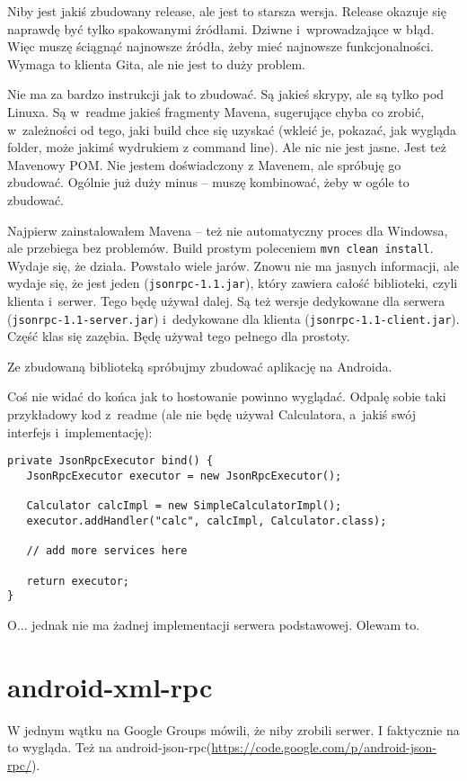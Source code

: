 Niby jest jakiś zbudowany release, ale jest to starsza wersja. Release okazuje się naprawdę być tylko spakowanymi źródłami. Dziwne i~wprowadzające w błąd.
Więc muszę ściągnąć najnowsze źródła, żeby mieć najnowsze funkcjonalności.
Wymaga to klienta Gita, ale nie jest to duży problem. 

Nie ma za bardzo instrukcji jak to zbudować. Są jakieś skrypy, ale są tylko pod Linuxa. Są w~readme jakieś fragmenty Mavena, sugerujące chyba co zrobić, w~zależności od tego, jaki build chce się uzyskać (wkleić je, pokazać, jak wygląda folder, może jakimś wydrukiem z command line). Ale nic nie jest jasne.
Jest też Mavenowy POM. Nie jestem doświadczony z Mavenem, ale spróbuję go zbudować. Ogólnie już duży minus -- muszę kombinować, żeby w ogóle to zbudować.

Najpierw zainstalowałem Mavena -- też nie automatyczny proces dla Windowsa, ale przebiega bez problemów. Build prostym poleceniem \texttt{mvn~clean~install}. Wydaje się, że działa.
Powstało wiele jarów.
Znowu nie ma jasnych informacji, ale wydaje się, że jest jeden (\texttt{jsonrpc-1.1.jar}), który zawiera całość biblioteki, czyli klienta i~serwer. Tego będę używał dalej. Są też wersje dedykowane dla serwera (\texttt{jsonrpc-1.1-server.jar}) i~dedykowane dla klienta (\texttt{jsonrpc-1.1-client.jar}). Część klas się zazębia.
Będę używał tego pełnego dla prostoty.

Ze zbudowaną biblioteką spróbujmy zbudować aplikację na Androida.

Coś nie widać do końca jak to hostowanie powinno wyglądać. Odpalę sobie taki przykładowy kod z~readme (ale nie będę używał Calculatora, a~jakiś swój interfejs i~implementację):
\begin{lstlisting}[frame=single, caption={Przykładowy sposób wystawiania serwera bez użycia serwletów}, label=kod:bla]
private JsonRpcExecutor bind() {
   JsonRpcExecutor executor = new JsonRpcExecutor();

   Calculator calcImpl = new SimpleCalculatorImpl();
   executor.addHandler("calc", calcImpl, Calculator.class); 

   // add more services here

   return executor;
}
\end{lstlisting}

O... jednak nie ma żadnej implementacji serwera podstawowej. Olewam to.



\section{android-xml-rpc}
W jednym wątku na Google Groups \cite{android-rpc-thread} mówili, że niby zrobili serwer. I faktycznie na to wygląda.
Też na android-json-rpc(\url{https://code.google.com/p/android-json-rpc/}).



